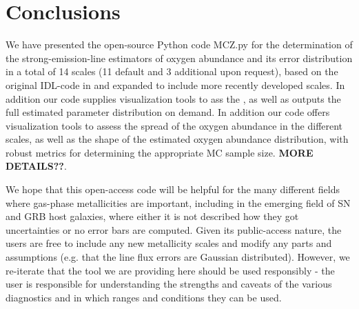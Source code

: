 \documentclass{emulateapj}
\begin{document}
\section{Conclusions}\label{conclusions_sec}

We have presented the open-source Python code MCZ.py for the determination of the strong-emission-line estimators of oxygen abundance and its error distribution in a total of 14 scales (11 default and 3 additional upon request), based on the original IDL-code in \citet{kewley02} and expanded to include more recently developed scales. In addition our code supplies visualization tools to ass the , as well as outputs the full estimated parameter distribution on demand. In addition our code offers visualization tools to assess the spread of the oxygen abundance in the different scales, as well as the shape of the estimated oxygen abundance distribution, with  robust metrics for determining the appropriate MC sample size.
\textbf{MORE DETAILS??}. 

We hope that this open-access code will be helpful for the many different fields where gas-phase metallicities are important, including in the emerging field of SN and GRB host galaxies, where either it is not described how they got uncertainties or no error bars are computed. Given its public-access nature, the users are free to include any new metallicity scales and modify any parts and assumptions (e.g. that the line flux errors are Gaussian distributed). However, we re-iterate that the tool we are providing here should be used responsibly - the user is responsible for understanding the strengths and caveats of the various diagnostics and in which ranges and conditions they can be used.
\end{document}
